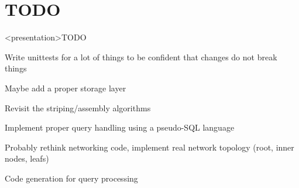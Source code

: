 \section{TODO}
\begin{frame}<presentation>{TODO}
\begin{niitemize}
 \item Write unittests for a lot of things to be confident that changes
  do not break things
 \item Maybe add a proper storage layer
 \item Revisit the striping/assembly algorithms
 \item Implement proper query handling using a pseudo-SQL language
 \item Probably rethink networking code, implement real network
  topology (root, inner nodes, leafs)
 \item Code generation for query processing
\end{niitemize}
\end{frame}


